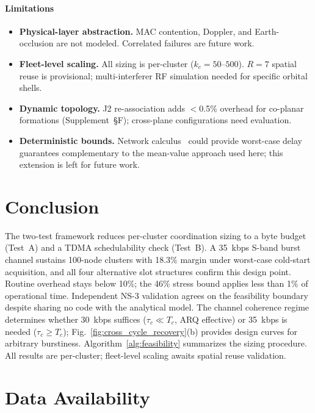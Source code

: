 \documentclass[journal]{IEEEtran}
\begin{document}
\paragraph{Limitations}
\begin{itemize}
    \item \textbf{Physical-layer abstraction.} MAC contention, Doppler, and Earth-occlusion are not modeled. Correlated failures are future work.
    \item \textbf{Fleet-level scaling.} All sizing is per-cluster ($k_c = 50$--$500$). $R = 7$ spatial reuse is provisional; multi-interferer RF simulation needed for specific orbital shells.
    \item \textbf{Dynamic topology.} J2 re-association adds $<$0.5\% overhead for co-planar formations (Supplement~\S F); cross-plane configurations need evaluation.
    \item \textbf{Deterministic bounds.} Network calculus~\cite{leboudec_netcalc} could provide worst-case delay guarantees complementary to the mean-value approach used here; this extension is left for future work.
\end{itemize}

\section{Conclusion}

The two-test framework reduces per-cluster coordination sizing to a byte budget (Test~A) and a TDMA schedulability check (Test~B). A 35~kbps S-band burst channel sustains 100-node clusters with 18.3\% margin under worst-case cold-start acquisition, and all four alternative slot structures confirm this design point. Routine overhead stays below 10\%; the 46\% stress bound applies less than 1\% of operational time. Independent NS-3 validation agrees on the feasibility boundary despite sharing no code with the analytical model. The channel coherence regime determines whether 30~kbps suffices ($\tau_c \ll T_c$, ARQ effective) or 35~kbps is needed ($\tau_c \geq T_c$); Fig.~\ref{fig:cross_cycle_recovery}(b) provides design curves for arbitrary burstiness. Algorithm~\ref{alg:feasibility} summarizes the sizing procedure. All results are per-cluster; fleet-level scaling awaits spatial reuse validation.

\section*{Data Availability}
\end{document}
